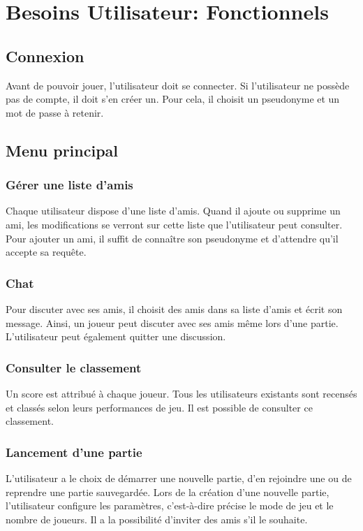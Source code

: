 
\section{Besoins Utilisateur: Fonctionnels}

\subsection{Connexion}
    Avant de pouvoir jouer, l'utilisateur doit se connecter. Si l'utilisateur ne possède pas de compte, il doit s'en créer un. Pour cela, il choisit un pseudonyme et un mot de passe à retenir. 

\subsection{Menu principal}

\subsubsection{Gérer une liste d'amis}
    Chaque utilisateur dispose d'une liste d'amis. Quand il ajoute ou supprime un ami, les modifications se verront sur cette liste que l'utilisateur peut consulter. Pour ajouter un ami, il suffit de connaître son pseudonyme et d'attendre qu'il accepte sa requête. 
    
\subsubsection{Chat}
    Pour discuter avec ses amis, il choisit des amis dans sa liste d'amis et écrit son message. Ainsi, un joueur peut discuter avec ses amis même lors d'une partie. L'utilisateur peut également quitter une discussion. 
    
\subsubsection{Consulter le classement}
    Un score est attribué à chaque joueur. Tous les utilisateurs existants sont recensés et classés selon leurs performances de jeu. Il est possible de consulter ce classement.

\subsubsection{Lancement d'une partie}
    L'utilisateur a le choix de démarrer une nouvelle partie, d'en rejoindre une ou de reprendre une partie sauvegardée. Lors de la création d'une nouvelle partie, l'utilisateur configure les paramètres, c'est-à-dire précise le mode de jeu et le nombre de joueurs. Il a la possibilité d'inviter des amis s'il le souhaite.



